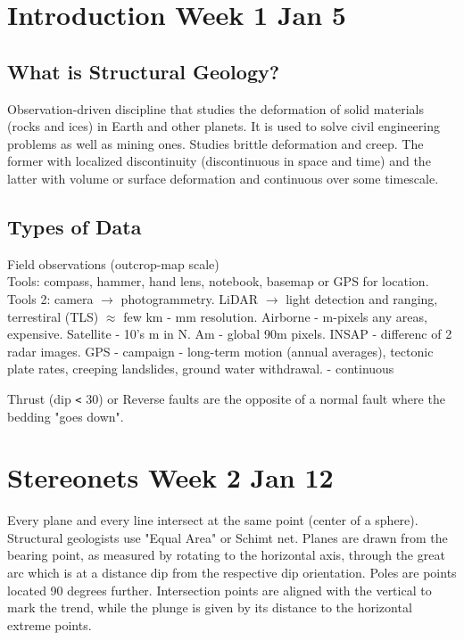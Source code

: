 \documentclass[12pt,a4paper]{report}
\author{Omar Gonzalez}
\begin{document}
\section*{Introduction Week 1 Jan 5}
\subsection*{What is Structural Geology?}
Observation-driven discipline that studies the deformation of solid materials (rocks and ices) in Earth and other planets.
It is used to solve civil engineering problems as well as mining ones.
Studies brittle deformation and creep. The former with localized discontinuity (discontinuous in space and time) and the latter with volume or surface deformation and continuous over some timescale.

\subsection*{Types of Data}
Field observations (outcrop-map scale)\\
\indent Tools: compass, hammer, hand lens, notebook, basemap or GPS for location.\\
\indent Tools 2: camera $\rightarrow$ photogrammetry. LiDAR $\rightarrow$ light detection and ranging, terrestiral (TLS) $\approx$ few km - mm resolution. Airborne - m-pixels any areas, expensive. Satellite - 10's m in N. Am - global 90m pixels. INSAP - differenc of 2 radar images.
GPS - campaign - long-term motion (annual averages), tectonic plate rates, creeping landslides, ground water withdrawal.
    - continuous

Thrust (dip \verb|<| 30) or Reverse faults are the opposite of a normal fault where the bedding "goes down".

\section*{Stereonets Week 2 Jan 12}
Every plane and every line intersect at the same point (center of a sphere).
Structural geologists use "Equal Area" or Schimt net.
Planes are drawn from the bearing point, as measured by rotating to the horizontal axis, through the great arc which is at a distance dip from
the respective dip orientation. Poles are points located 90 degrees further. Intersection points are aligned with the vertical to mark the trend,
while the plunge is given by its distance to the horizontal extreme points.
\end{document}
